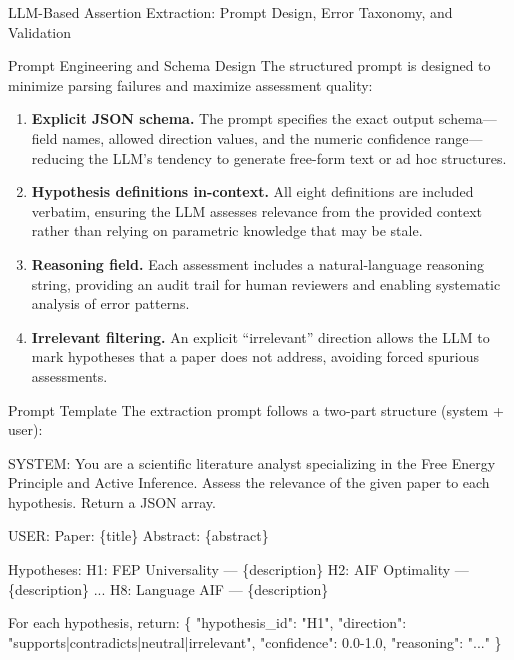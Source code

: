 \documentclass[
  ignorenonframetext,
]{beamer}
\newenvironment{Shaded}{}{}
\newcommand{\NormalTok}[1]{#1}
\begin{document}
\begin{frame}{LLM-Based Assertion Extraction:
Prompt Design, Error Taxonomy, and Validation
\label{sec:extraction_pipeline}}
\begin{block}{Prompt Engineering and Schema Design}
\protect{}\label{prompt-engineering-and-schema-design}
The structured prompt is designed to minimize parsing failures and
maximize assessment quality:

\begin{enumerate}
\item
  \textbf{Explicit JSON schema.} The prompt specifies the exact output
  schema---field names, allowed direction values, and the numeric
  confidence range---reducing the LLM's tendency to generate free-form
  text or ad hoc structures.
\item
  \textbf{Hypothesis definitions in-context.} All eight definitions are
  included verbatim, ensuring the LLM assesses relevance from the
  provided context rather than relying on parametric knowledge that may
  be stale.
\item
  \textbf{Reasoning field.} Each assessment includes a natural-language
  reasoning string, providing an audit trail for human reviewers and
  enabling systematic analysis of error patterns.
\item
  \textbf{Irrelevant filtering.} An explicit ``irrelevant'' direction
  allows the LLM to mark hypotheses that a paper does not address,
  avoiding forced spurious assessments.
\end{enumerate}

\begin{block}{Prompt Template}
\protect{}\label{prompt-template}
The extraction prompt follows a two-part structure (system + user):

\begin{Shaded}
\begin{Highlighting}[]
\NormalTok{SYSTEM: You are a scientific literature analyst specializing in the}
\NormalTok{Free Energy Principle and Active Inference. Assess the relevance of}
\NormalTok{the given paper to each hypothesis. Return a JSON array.}

\NormalTok{USER:}
\NormalTok{Paper: \{title\}}
\NormalTok{Abstract: \{abstract\}}

\NormalTok{Hypotheses:}
\NormalTok{H1: FEP Universality — \{description\}}
\NormalTok{H2: AIF Optimality — \{description\}}
\NormalTok{...}
\NormalTok{H8: Language AIF — \{description\}}

\NormalTok{For each hypothesis, return:}
\NormalTok{\{}
\NormalTok{  "hypothesis\_id": "H1",}
\NormalTok{  "direction": "supports|contradicts|neutral|irrelevant",}
\NormalTok{  "confidence": 0.0{-}1.0,}
\NormalTok{  "reasoning": "..."}
\NormalTok{\}}
\end{Highlighting}
\end{Shaded}


\end{block}
\end{block}
\end{frame}
\end{document}
